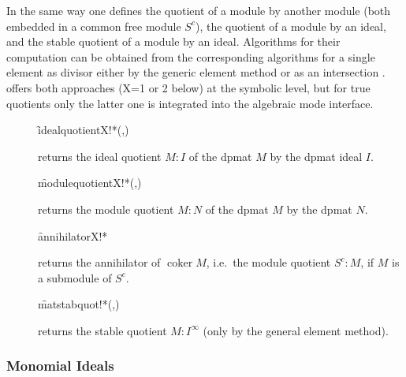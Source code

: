 In the same way one defines the quotient of a module by another
module (both embedded in a common free module $S^c$), the quotient of
a module by an ideal, and the stable quotient of a module by an
ideal. Algorithms for their computation can be obtained from the
corresponding algorithms for a single element as divisor either by
the generic element method \cite{Eisenbud:95} or as an intersection
\cite[6.31]{Becker:93}.  offers both approaches (X=1 or 2 below) at
the symbolic level, but for true quotients only the latter one is
integrated into the algebraic mode interface.
\begin{description}

\item[]
  \begin{syntax}
    \f{idealquotientX!*}(,)
  \end{syntax}
  \hypertarget{procedure:IDEALQUOTIENTX!*}{}
returns the ideal quotient $M:I$ of the dpmat $M$ by the dpmat
ideal $I$.

\item[]
  \begin{syntax}
    \f{modulequotientX!*}(,)
  \end{syntax}
  \hypertarget{procedure:MODULEQUOTIENTX!*}{}
returns the module quotient $M:N$ of the dpmat $M$ by the dpmat
$N$.

\item[]
  \begin{syntax}
    \f{annihilatorX!*} 
  \end{syntax}
  \hypertarget{procedure:ANNIHILATORX!*}{}
returns the annihilator of $\mathop{\mathrm{coker}} M$, i.e.\ the module quotient
$S^c:M$, if $M$ is a submodule of $S^c$.

\item[]
  \begin{syntax}
    \f{matstabquot!*}(,)
  \end{syntax}
  \hypertarget{procedure:MATSTABQUOT!*}{}
returns the stable quotient $M:I^\infty$ (only by the general element
method).
\end{description}


\subsubsection{Monomial Ideals}

